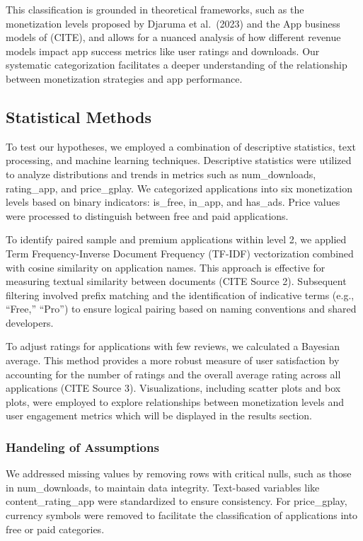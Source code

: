 \documentclass[
  12pt,
  a4paper,
]{article}
\begin{document}
This classification is grounded in theoretical frameworks, such as the
monetization levels proposed by Djaruma et al.~(2023) and the App
business models of (CITE), and allows for a nuanced analysis of how
different revenue models impact app success metrics like user ratings
and downloads. Our systematic categorization facilitates a deeper
understanding of the relationship between monetization strategies and
app performance.

\subsection{Statistical Methods}\label{statistical-methods}

To test our hypotheses, we employed a combination of descriptive
statistics, text processing, and machine learning techniques.
Descriptive statistics were utilized to analyze distributions and trends
in metrics such as num\_downloads, rating\_app, and price\_gplay. We
categorized applications into six monetization levels based on binary
indicators: is\_free, in\_app, and has\_ads. Price values were processed
to distinguish between free and paid applications.

To identify paired sample and premium applications within level 2, we
applied Term Frequency-Inverse Document Frequency (TF-IDF) vectorization
combined with cosine similarity on application names. This approach is
effective for measuring textual similarity between documents (CITE
Source 2). Subsequent filtering involved prefix matching and the
identification of indicative terms (e.g., ``Free,'' ``Pro'') to ensure
logical pairing based on naming conventions and shared developers.

To adjust ratings for applications with few reviews, we calculated a
Bayesian average. This method provides a more robust measure of user
satisfaction by accounting for the number of ratings and the overall
average rating across all applications (CITE Source 3). Visualizations,
including scatter plots and box plots, were employed to explore
relationships between monetization levels and user engagement metrics
which will be displayed in the results section.

\subsubsection{Handeling of Assumptions}\label{handeling-of-assumptions}

We addressed missing values by removing rows with critical nulls, such
as those in num\_downloads, to maintain data integrity. Text-based
variables like content\_rating\_app were standardized to ensure
consistency. For price\_gplay, currency symbols were removed to
facilitate the classification of applications into free or paid
categories.
\end{document}
